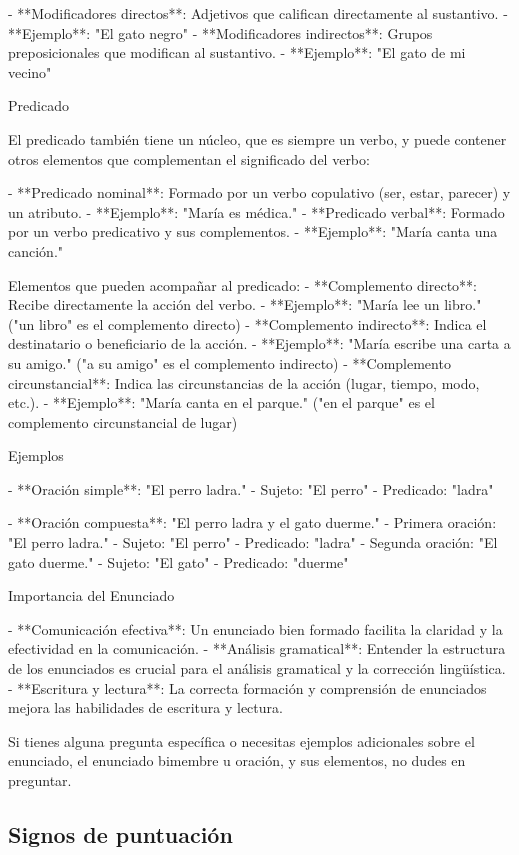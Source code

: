 - **Modificadores directos**: Adjetivos que califican directamente al sustantivo.
  - **Ejemplo**: "El gato negro"
- **Modificadores indirectos**: Grupos preposicionales que modifican al sustantivo.
  - **Ejemplo**: "El gato de mi vecino"

 Predicado

El predicado también tiene un núcleo, que es siempre un verbo, y puede contener otros elementos que complementan el significado del verbo:

- **Predicado nominal**: Formado por un verbo copulativo (ser, estar, parecer) y un atributo.
  - **Ejemplo**: "María es médica."
- **Predicado verbal**: Formado por un verbo predicativo y sus complementos.
  - **Ejemplo**: "María canta una canción."

Elementos que pueden acompañar al predicado:
- **Complemento directo**: Recibe directamente la acción del verbo.
  - **Ejemplo**: "María lee un libro." ("un libro" es el complemento directo)
- **Complemento indirecto**: Indica el destinatario o beneficiario de la acción.
  - **Ejemplo**: "María escribe una carta a su amigo." ("a su amigo" es el complemento indirecto)
- **Complemento circunstancial**: Indica las circunstancias de la acción (lugar, tiempo, modo, etc.).
  - **Ejemplo**: "María canta en el parque." ("en el parque" es el complemento circunstancial de lugar)

 Ejemplos

- **Oración simple**: "El perro ladra."
  - Sujeto: "El perro"
  - Predicado: "ladra"

- **Oración compuesta**: "El perro ladra y el gato duerme."
  - Primera oración: "El perro ladra."
    - Sujeto: "El perro"
    - Predicado: "ladra"
  - Segunda oración: "El gato duerme."
    - Sujeto: "El gato"
    - Predicado: "duerme"

 Importancia del Enunciado

- **Comunicación efectiva**: Un enunciado bien formado facilita la claridad y la efectividad en la comunicación.
- **Análisis gramatical**: Entender la estructura de los enunciados es crucial para el análisis gramatical y la corrección lingüística.
- **Escritura y lectura**: La correcta formación y comprensión de enunciados mejora las habilidades de escritura y lectura.

Si tienes alguna pregunta específica o necesitas ejemplos adicionales sobre el enunciado, el enunciado bimembre u oración, y sus elementos, no dudes en preguntar.

\subsection{Signos de puntuación}

